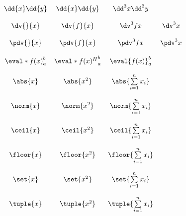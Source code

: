 \documentclass{unittest}
\begin{document}
\(\begin{array}{ccccc}
\\\\%
	\dd{x}\dd{y} & \dd{x}\dd{y} &\dd^3{x}\dd^3{y}
\\\\%
	\dv{}{x} & \dv{f}{x} & \dv^3{f}{x} & \dv^3{}{x}
\\\\%
	\pdv{}{x} & \pdv{f}{x} & \pdv^3{f}{x} & \pdv^3{}{x}
\\\\%
	\eval*{f(x)}_a^b & \eval*{f(x)^H}_a^b & \eval{f(x)}_a^b
\\\\%
	\abs{x} & \abs{x^2} & \abs{\sum\limits_{i=1}^n x_i}
\\\\%
	\norm{x} & \norm{x^2} & \norm{\sum\limits_{i=1}^n x_i}
\\\\%
	\ceil{x} & \ceil{x^2} & \ceil{\sum\limits_{i=1}^n x_i}
\\\\%
	\floor{x} & \floor{x^2} & \floor{\sum\limits_{i=1}^n x_i}
\\\\%
	\set{x} & \set{x^2} & \set{\sum\limits_{i=1}^n x_i}
\\\\%
	\tuple{x} & \tuple{x^2} & \tuple{\sum\limits_{i=1}^n x_i}

\end{array}\)
\end{document}
